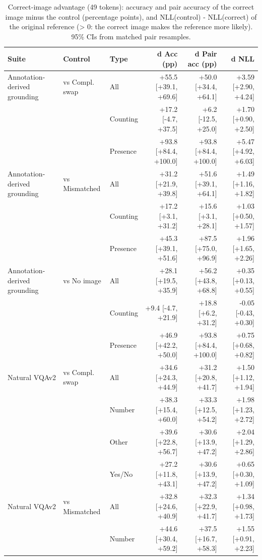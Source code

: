 \begin{table}[t]
\centering
\small
\caption{Correct-image advantage (49 tokens): accuracy and pair accuracy of the correct image minus the control (percentage points), and NLL(control) - NLL(correct) of the original reference (> 0: the correct image makes the reference more likely). 95\% CIs from matched pair resamples.}
\label{tab:t2_t3_correct_image_advantage_compress49}
\begin{tabular}{lllrrr}
\toprule
Suite & Control & Type & d Acc (pp) & d Pair acc (pp) & d NLL \\
\midrule
Annotation-derived grounding & vs Compl. swap & All & +55.5 [+39.1, +69.6] & +50.0 [+34.4, +64.1] & +3.59 [+2.90, +4.24] \\
 &  & Counting & +17.2 [-4.7, +37.5] & +6.2 [-12.5, +25.0] & +1.70 [+0.90, +2.50] \\
 &  & Presence & +93.8 [+84.4, +100.0] & +93.8 [+84.4, +100.0] & +5.47 [+4.92, +6.03] \\
Annotation-derived grounding & vs Mismatched & All & +31.2 [+21.9, +39.8] & +51.6 [+39.1, +64.1] & +1.49 [+1.16, +1.82] \\
 &  & Counting & +17.2 [+3.1, +31.2] & +15.6 [+3.1, +28.1] & +1.03 [+0.50, +1.57] \\
 &  & Presence & +45.3 [+39.1, +51.6] & +87.5 [+75.0, +96.9] & +1.96 [+1.65, +2.26] \\
Annotation-derived grounding & vs No image & All & +28.1 [+19.5, +35.9] & +56.2 [+43.8, +68.8] & +0.35 [+0.13, +0.55] \\
 &  & Counting & +9.4 [-4.7, +21.9] & +18.8 [+6.2, +31.2] & -0.05 [-0.43, +0.30] \\
 &  & Presence & +46.9 [+42.2, +50.0] & +93.8 [+84.4, +100.0] & +0.75 [+0.68, +0.82] \\
Natural VQAv2 & vs Compl. swap & All & +34.6 [+24.3, +44.9] & +31.2 [+20.8, +41.7] & +1.50 [+1.12, +1.94] \\
 &  & Number & +38.3 [+15.4, +60.0] & +33.3 [+12.5, +54.2] & +1.98 [+1.23, +2.72] \\
 &  & Other & +39.6 [+22.8, +56.7] & +30.6 [+13.9, +47.2] & +2.04 [+1.29, +2.86] \\
 &  & Yes/No & +27.2 [+11.8, +43.1] & +30.6 [+13.9, +47.2] & +0.65 [+0.30, +1.09] \\
Natural VQAv2 & vs Mismatched & All & +32.8 [+24.6, +40.9] & +32.3 [+22.9, +41.7] & +1.34 [+0.98, +1.73] \\
 &  & Number & +44.6 [+30.4, +59.2] & +37.5 [+16.7, +58.3] & +1.55 [+0.91, +2.23] \\

\end{tabular}
\end{table}
